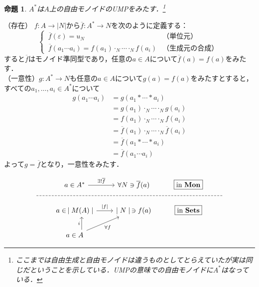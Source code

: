 \documentclass[dvipdfmx,a4j,10pt]{jsarticle}
\makeatletter
\theoremstyle{mystyle1}
\newtheorem{prop}[dfn]{命題}
\theoremstyle{mystyle2}
\renewenvironment{proof}[1][\proofname]{\par
  \pushQED{\qed}%
  \normalfont
  \topsep6\p@\@plus6\p@ \trivlist
  \item[\hskip\labelsep{\bfseries\sffamily #1}]\ignorespaces
}{%
  \popQED\endtrivlist\@endpefalse
}
\renewcommand\proofname{証明}
\newcommand{\Sets}{\mathbf{Sets}}
\newcommand{\Mon}{\mathbf{Mon}}
\makeatother
\begin{document}
\setcounter{dfn}{8}

\begin{prop}\label{prop:1-9}
	$A^*$は$A$上の自由モノイドのUMPをみたす．\footnote{ここまでは自由生成と自由モノイドは違うものとしてとらえていたが実は同じだということを示している．UMPの意味での自由モノイドに$A^*$はなっている．}
\end{prop}

\begin{proof}（存在）
	$f:A\to|N|$から$\overline{f}:A^*\to N$を次のように定義する：
	\[
		\begin{cases}
			\,\overline{f}(\varepsilon)=u_N                                   & （単位元）       \\
			\,\overline{f}(a_1\cdots a_i)=f(a_1)\cdot_N \cdots \cdot_N f(a_i) & （生成元の合成）
		\end{cases}
	\]
	すると$\overline{f}$はモノイド準同型であり，任意の$a\in A$について$\overline{f}(a)=f(a)$をみたす．\\
	（一意性）$g:A^*\to N$も任意の$a\in A$について$g(a)=f(a)$をみたすとすると，すべての$a_1,\ldots,a_i \in A^*$について
	\[
		\begin{split}
			g(a_1\cdots a_i) &= g(a_1 * \cdots * a_i) \\
			& = g(a_1)\cdot_N \cdots \cdot_N g(a_i)\\
			& = f(a_1)\cdot_N \cdots \cdot_N f(a_i)\\
			& = \overline{f}(a_1)\cdot_N \cdots \cdot_N \overline{f}(a_i) \\
			& = \overline{f}(a_1 * \cdots * a_i) \\
			& = \overline{f}(a_1 \cdots a_i)
		\end{split}
	\]
	よって$g=\overline{f}$となり，一意性をみたす．

	\begin{equation}
		\begin{tikzcd}
			& a \in A^* \arrow[r,"\exists !\overline{f}"] & \forall N \ni \overline{f}(a) & \fbox{in $\Mon$} & \\ [-3.2ex]
			|[alias=X]|\arrow[rrrr,dash,dashed,to=Y] & & & &|[alias=Y]| \\ [-3.2ex]
			& a \in \,\mid M(A)\mid \arrow[r,"|f|"] & \mid N\mid \,\ni f(a) & \fbox{in $\Sets$} & \\
			& a \in A \arrow[u,"i",xshift=1em] \arrow[ru,"\forall f"']
		\end{tikzcd}
	\end{equation}
\end{proof}
\end{document}
